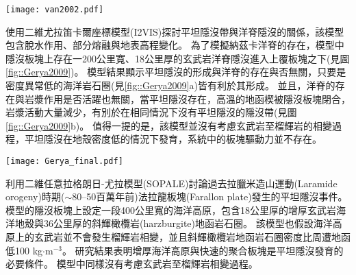 \begin{figure*}[ht!]
    \centering
    \texttt{[image: van2002.pdf]}
    \caption[正常的隱沒帶與包含海洋高原的隱沒帶隨模型時間變化，摘自\citealp{van2002role}]{正常的隱沒帶(左)與包含海洋高原的隱沒帶(右)隨模型時間變化，摘自\citealp{van2002role}。黑白區域繪出海洋地殼的化學成分從玄武岩(黑)到榴輝岩(白)的變化。水平軸為與海溝的距離，背景顏色為溫度。
    }
    \label{fig::van2002}
\end{figure*}

\citealp{Gerya2009}使用二維尤拉笛卡爾座標模型(I2VIS)探討平坦隱沒帶與洋脊隱沒的關係，該模型包含脫水作用、部分熔融與地表高程變化。
為了模擬納茲卡洋脊的存在，模型中隱沒板塊上存在一200公里寬、18公里厚的玄武岩洋脊隱沒進入上覆板塊之下(見圖\ref{fig::Gerya2009})。
模型結果顯示平坦隱沒的形成與洋脊的存在與否無關，只要是密度異常低的海洋岩石圈(見\ref{fig::Gerya2009}a)皆有利於其形成。
並且，洋脊的存在與岩漿作用是否活躍也無關，當平坦隱沒存在，高溫的地函楔被隱沒板塊閉合，岩漿活動大量減少，有別於在相同情況下沒有平坦隱沒的隱沒帶(見圖\ref{fig::Gerya2009}b)。
值得一提的是，該模型並沒有考慮玄武岩至榴輝岩的相變過程，平坦隱沒在地殼密度低的情況下發育，系統中的板塊驅動力並不存在。

\begin{figure*}[ht!]
    \centering
    \texttt{[image: Gerya\_final.pdf]}
    \caption[\citealp{Gerya2009}平坦隱沒模型結果]{\citealp{Gerya2009}中平坦隱沒模型於第12個百萬年的結果。圖組(a)與圖組(b)分別為隱沒海洋地函岩石圈密度$3100 kgm^{-3}$與$3300 kgm^{-3}$的結果。(a)上圖與(b)上圖為包含洋脊隱沒的模型，(a)(b)下圖為不包含洋脊的模型，圖中白線為等溫線。其中，顏色代表不同岩相：1、2=大陸地殼、3、4=沉積物、5、6=玄武岩、7、8=輝長岩、9、10=無水地函、11=蛇紋岩、12、13、14=含水地函。
    }
    \label{fig::Gerya2009}
\end{figure*}

\citealp{Liu2016}利用二維任意拉格朗日-尤拉模型(SOPALE)討論過去拉臘米造山運動(Laramide orogeny)時期($\sim$80–50百萬年前)法拉龍板塊(Farallon plate)發生的平坦隱沒事件。
模型的隱沒板塊上設定一段400公里寬的海洋高原，包含18公里厚的增厚玄武岩海洋地殼與36公里厚的斜輝橄欖岩(harzburgite)地函岩石圈。
該模型也假設海洋高原上的玄武岩並不會發生榴輝岩相變，並且斜輝橄欖岩地函岩石圈密度比周遭地函低100 kg$\cdot$m$^{-3}$。
研究結果表明增厚海洋高原與快速的聚合板塊是平坦隱沒發育的必要條件。
模型中同樣沒有考慮玄武岩至榴輝岩相變過程。

